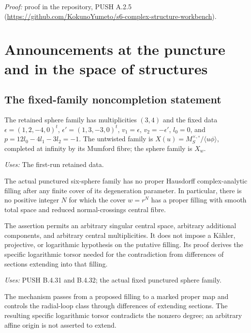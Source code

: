 \noindent\emph{Proof:} proof in the repository, PUSH A.2.5 (\url{https://github.com/KokunoYumeto/s6-complex-structure-workbench}).

\section{Announcements at the puncture and in the space of structures}
\label{sec:announcements}
\subsection{The fixed-family noncompletion statement}
\begin{definition}\label{push:B.4.33.scope}
The retained sphere family has multiplicities $(3,4)$ and the fixed data
$\epsilon=(1,2,-4,0)^t$, $\epsilon'=(1,3,-3,0)^t$,
$v_1=\epsilon$, $v_2=-\epsilon'$, $l_0=0$, and $p=12l_0-4l_1-3l_2=-1$.
The untwisted family is
$X(u)=M_S^{\times,\circ}/\langle u\phi\rangle$, completed at infinity
by its Mumford fibre; the sphere family is $X_w$.
\end{definition}
\noindent\emph{Uses:} The first-run retained data.\par

\begin{announcement}[PUSH B.4.33; A]\label{push:B.4.33}
The actual punctured six-sphere family has no proper
Hausdorff complex-analytic filling after any finite
cover of its degeneration parameter. In particular,
there is no positive integer $N$ for which the cover
$w=r^N$ has a proper filling with smooth total space
and reduced normal-crossings central fibre.

The assertion permits an arbitrary singular central
space, arbitrary additional components, and arbitrary
central multiplicities. It does not impose a
K\"ahler, projective, or logarithmic hypothesis on
the putative filling. Its proof derives the specific
logarithmic torsor needed for the contradiction from
differences of sections extending into that filling.
\end{announcement}
\noindent\emph{Uses:} PUSH B.4.31 and B.4.32; the actual fixed punctured sphere family.\par

The mechanism passes from a proposed filling to a marked proper map and controls the radial-loop class through differences of extending sections. The resulting specific logarithmic torsor contradicts the nonzero degree; an arbitrary affine origin is not asserted to extend.

